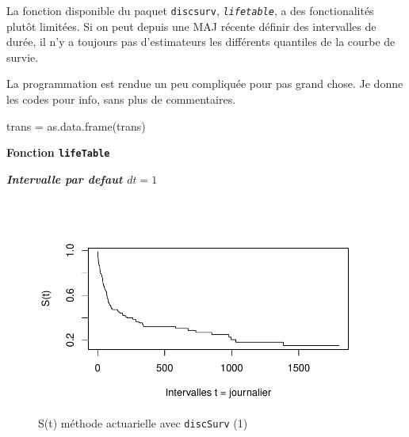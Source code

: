 \documentclass[
  12pt,
  letterpaper,
  DIV=11,
  numbers=noendperiod,
  onepage,
  openany]{scrreprt}
\newenvironment{Shaded}{\begin{snugshade}}{\end{snugshade}}
\newcommand{\AttributeTok}[1]{\textcolor[rgb]{0.80,0.80,0.80}{#1}}
\newcommand{\DecValTok}[1]{\textcolor[rgb]{0.86,0.86,0.80}{#1}}
\newcommand{\FunctionTok}[1]{\textcolor[rgb]{0.94,0.94,0.56}{#1}}
\newcommand{\NormalTok}[1]{\textcolor[rgb]{0.80,0.80,0.80}{#1}}
\newcommand{\OtherTok}[1]{\textcolor[rgb]{0.94,0.94,0.56}{#1}}
\newcommand{\SpecialCharTok}[1]{\textcolor[rgb]{0.86,0.64,0.64}{#1}}
\newcommand{\StringTok}[1]{\textcolor[rgb]{0.80,0.58,0.58}{#1}}
\begin{document}
La fonction disponible du paquet \texttt{discsurv},
\emph{\texttt{lifetable}}, a des fonctionalités plutôt limitées. Si on
peut depuis une MAJ récente définir des intervalles de durée, il n'y a
toujours pas d'estimateurs les différents quantiles de la courbe de
survie.

La programmation est rendue un peu compliquée pour pas grand chose. Je
donne les codes pour info, sans plus de commentaires.

\begin{Shaded}
\begin{Highlighting}[]
\NormalTok{trans }\OtherTok{=} \FunctionTok{as.data.frame}\NormalTok{(trans)}
\end{Highlighting}
\end{Shaded}

\textbf{Fonction \texttt{lifeTable}}

\textbf{\emph{Intervalle par defaut \(dt=1\)}}

\begin{Shaded}
\end{Shaded}

\begin{figure}[H]

\caption{S(t) méthode actuarielle avec \texttt{discSurv} (1)}

{\centering \includegraphics{14-R_files/figure-pdf/unnamed-chunk-4-1.pdf}

}

\end{figure}
\end{document}
